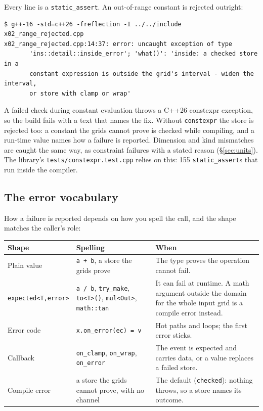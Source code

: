 \documentclass[11pt,a4paper]{article}
\newcommand{\code}[1]{\texttt{\small #1}}
\newcommand{\file}[1]{\texttt{\small #1}}
\begin{document}
\noindent
Every line is a \code{static\_assert}. An out-of-range constant is rejected
outright:

\begin{lstlisting}[style=term]
$ g++-16 -std=c++26 -freflection -I ../../include x02_range_rejected.cpp
x02_range_rejected.cpp:14:37: error: uncaught exception of type
       'ins::detail::inside_error'; 'what()': 'inside: a checked store in a
       constant expression is outside the grid's interval - widen the interval,
       or store with clamp or wrap'
\end{lstlisting}

\noindent
A failed check during constant evaluation throws a C++26 constexpr exception,
so the build fails with a text that names the fix. Without \code{constexpr}
the store is rejected too: a constant the grids cannot prove is checked while
compiling, and a run-time value names how a failure is reported. Dimension and kind mismatches are
caught the same way, as constraint failures with a stated reason
(\S\ref{sec:units}). The library's
\file{tests/constexpr.test.cpp} relies on this: 155
\code{static\_assert}s that run inside the compiler.

\subsection{The error vocabulary}

How a failure is reported depends on how you spell the call, and the shape
matches the caller's role:

\begin{center}
\small
\begin{tabular}{@{}l >{\raggedright\arraybackslash}p{4.3cm} >{\raggedright\arraybackslash}p{6.4cm}@{}}
\toprule
Shape & Spelling & When \\
\midrule
Plain value & \code{a + b}, a store the grids prove & The type proves the operation cannot fail. \\
\code{expected<T,error>} & \code{a / b}, \code{try\_make}, \code{to<T>()}, \code{mul<Out>}, \code{math::tan} & It can fail at runtime. A math argument outside the domain for the whole input grid is a compile error instead. \\
Error code & \code{x.on\_error(ec) = v} & Hot paths and loops; the first error sticks. \\
Callback & \code{on\_clamp}, \code{on\_wrap}, \code{on\_error} & The event is expected and carries data, or a value replaces a failed store. \\
Compile error & a store the grids cannot prove, with no channel & The default (\code{checked}): nothing throws, so a store names its outcome. \\
\bottomrule
\end{tabular}
\end{center}
\end{document}
